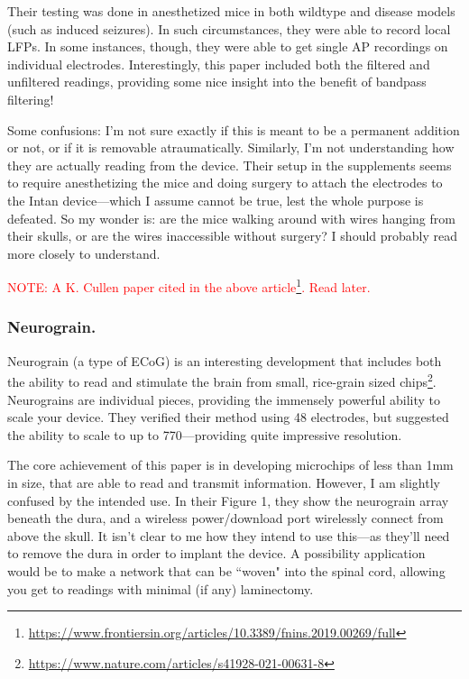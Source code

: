 \documentclass[12pt]{report}
\begin{document}
Their testing was done in anesthetized mice in both wildtype and disease models (such as induced seizures). In such circumstances, they were able to record local LFPs. In some instances, though, they were able to get single AP recordings on individual electrodes. Interestingly, this paper included both the filtered and unfiltered readings, providing some nice insight into the benefit of bandpass filtering!\newline

Some confusions: I'm not sure exactly if this is meant to be a permanent addition or not, or if it is removable atraumatically. Similarly, I'm not understanding how they are actually reading from the device. Their setup in the supplements seems to require anesthetizing the mice and doing surgery to attach the electrodes to the Intan device---which I assume cannot be true, lest the whole purpose is defeated. So my wonder is: are the mice walking around with wires hanging from their skulls, or are the wires inaccessible without surgery? I should probably read more closely to understand.\newline


\textcolor{red}{NOTE: A K. Cullen paper cited in the above article\footnote{\url{https://www.frontiersin.org/articles/10.3389/fnins.2019.00269/full}}. Read later.}

\subsubsection{Neurograin.}

Neurograin (a type of ECoG) is an interesting development that includes both the ability to read and stimulate the brain from small, rice-grain sized chips\footnote{\url{https://www.nature.com/articles/s41928-021-00631-8}}. Neurograins are individual pieces, providing the immensely powerful ability to scale your device. They verified their method using 48 electrodes, but suggested the ability to scale to up to 770---providing quite impressive resolution.\newline

The core achievement of this paper is in developing microchips of less than 1mm in size, that are able to read and transmit information. However, I am slightly confused by the intended use. In their Figure 1, they show the neurograin array beneath the dura, and a wireless power/download port wirelessly connect from above the skull. It isn't clear to me how they intend to use this---as they'll need to remove the dura in order to implant the device. A possibility application would be to make a network that can be ``woven" into the spinal cord, allowing you get to readings with minimal (if any) laminectomy. \newline
\end{document}
